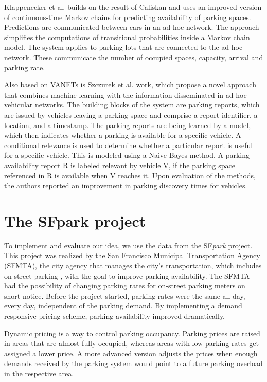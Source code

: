 \documentclass{ws-ijait}
\newcommand{\cmmnt}[1]{\ignorespaces}
\begin{document}
	Klappenecker et al. \cmmnt{ref klappenecker} builds on the result of Caliskan and uses an improved version of continuous-time Markov chains for predicting availability of parking spaces. Predictions are communicated between cars in an ad-hoc network. The approach simplifies the computations of transitional probabilities inside a Markov chain model. The system applies to parking lots that are connected to the ad-hoc network. These communicate the number of occupied spaces, capacity, arrival and parking rate. 
	
	Also based on VANETs is Szczurek et al. \cmmnt{ref szczurek} work, which propose a novel approach that combines machine learning with the information disseminated in ad-hoc vehicular networks. The building blocks of the system are parking reports, which are issued by vehicles leaving a parking space and comprise a report identifier, a location, and a timestamp. The parking reports are being learned by a model, which then indicates whether a parking is available for a specific vehicle. A conditional relevance is used to determine whether a particular report is useful for a specific vehicle. This is modeled using a Naive Bayes method. A parking availability report R is labeled relevant by vehicle V, if the parking space referenced in R is available when V reaches it. Upon evaluation of the methods, the authors reported an improvement in parking discovery times for vehicles.
	
	\section{The SFpark project}
	To implement and evaluate our idea, we use the data from the SF\textit{park} project. This project was realized by the San Francisco Municipal Transportation Agency (SFMTA), the city agency that manages the city's transportation, which includes on-street parking \cmmnt{ref sfpark} \cmmnt{ref sfpark_evaluation}, with the goal to improve parking availability. The SFMTA had the possibility of changing parking rates for on-street parking meters on short notice. Before the project started, parking rates were the same all day, every day, independent of the parking demand. By implementing a demand responsive pricing scheme, parking availability improved dramatically.
	
	Dynamic pricing is a way to control parking occupancy. Parking prices are raised in areas that are almost fully occupied, whereas areas with low parking rates get assigned a lower price. A more advanced version adjusts the prices when enough demands received by the parking system would point to a future parking overload in the respective area.
	
\end{document}
